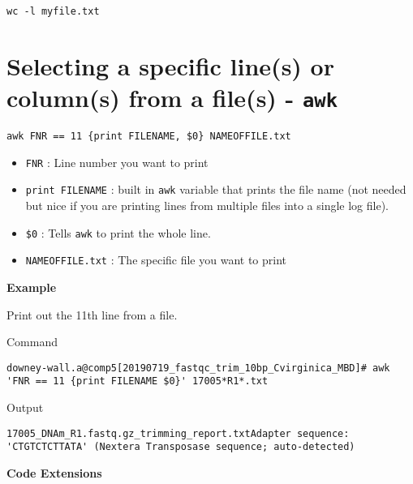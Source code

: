 \documentclass[
  letterpaper,
  DIV=11,
  numbers=noendperiod]{scrreprt}
\begin{document}
\begin{verbatim}
wc -l myfile.txt
\end{verbatim}

\hypertarget{selecting-a-specific-lines-or-columns-from-a-files---awk}{%
\section*{\texorpdfstring{\textbf{Selecting a specific line(s) or
column(s) from a file(s) -
\texttt{awk}}}{Selecting a specific line(s) or column(s) from a file(s) - awk}}\label{selecting-a-specific-lines-or-columns-from-a-files---awk}}


\texttt{awk\ \textquotesingle{}FNR\ ==\ 11\ \{print\ FILENAME,\ \$0\}\textquotesingle{}\ NAMEOFFILE.txt}

\begin{itemize}
\item
  \texttt{FNR} : Line number you want to print
\item
  \texttt{print\ FILENAME} : built in \texttt{awk} variable that prints
  the file name (not needed but nice if you are printing lines from
  multiple files into a single log file).
\item
  \texttt{\$0} : Tells \texttt{awk} to print the whole line.
\item
  \texttt{NAMEOFFILE.txt} : The specific file you want to print
\end{itemize}

\textbf{Example}

Print out the 11th line from a file.

Command

\begin{verbatim}
downey-wall.a@comp5[20190719_fastqc_trim_10bp_Cvirginica_MBD]# awk 'FNR == 11 {print FILENAME $0}' 17005*R1*.txt 
\end{verbatim}

Output

\begin{verbatim}
17005_DNAm_R1.fastq.gz_trimming_report.txtAdapter sequence: 'CTGTCTCTTATA' (Nextera Transposase sequence; auto-detected)
\end{verbatim}

\textbf{Code Extensions}
\end{document}
